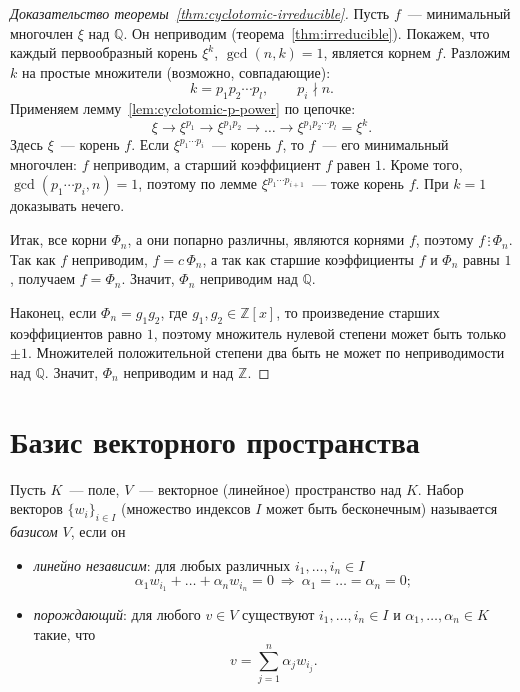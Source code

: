 \documentclass[12pt]{article}
\begin{document}
	\begin{proof}[Доказательство теоремы~\ref{thm:cyclotomic-irreducible}]
		Пусть $f$~--- минимальный многочлен $\xi$ над $\mathbb{Q}$. Он неприводим (теорема~\ref{thm:irreducible}). Покажем, что каждый первообразный корень $\xi^k$, $\gcd(n, k) = 1$, является корнем $f$. Разложим $k$ на простые множители (возможно, совпадающие):
		\[
			k = p_1 p_2 \cdots p_l, \qquad p_i \nmid n.
		\]
		Применяем лемму~\ref{lem:cyclotomic-p-power} по цепочке:
		\[
			\xi \longrightarrow \xi^{p_1} \longrightarrow \xi^{p_1 p_2} \longrightarrow \ldots \longrightarrow \xi^{p_1 p_2 \cdots p_l} = \xi^k.
		\]
		Здесь $\xi$~--- корень $f$. Если $\xi^{p_1 \cdots p_i}$~--- корень $f$, то $f$~--- его минимальный многочлен: $f$ неприводим, а старший коэффициент $f$ равен $1$. Кроме того, $\gcd(p_1 \cdots p_i, n) = 1$, поэтому по лемме $\xi^{p_1 \cdots p_{i+1}}$~--- тоже корень $f$. При $k = 1$ доказывать нечего.

		Итак, все корни $\Phi_n$, а они попарно различны, являются корнями $f$, поэтому $f \,\vdots\, \Phi_n$. Так как $f$ неприводим, $f = c\,\Phi_n$, а так как старшие коэффициенты $f$ и $\Phi_n$ равны $1$, получаем $f = \Phi_n$. Значит, $\Phi_n$ неприводим над $\mathbb{Q}$.

		Наконец, если $\Phi_n = g_1 g_2$, где $g_1, g_2 \in \mathbb{Z}[x]$, то произведение старших коэффициентов равно $1$, поэтому множитель нулевой степени может быть только $\pm 1$. Множителей положительной степени два быть не может по неприводимости над $\mathbb{Q}$. Значит, $\Phi_n$ неприводим и над $\mathbb{Z}$.
	\end{proof}

	\section{Базис векторного пространства}

	\begin{definition}[Базис]\label{def:basis}
		Пусть $K$~--- поле, $V$~--- векторное (линейное) пространство над $K$. Набор векторов $\{ w_i \}_{i \in I}$ (множество индексов $I$ может быть бесконечным) называется \emph{базисом} $V$, если он
		\begin{itemize}
			\item \emph{линейно независим}: для любых различных $i_1, \ldots, i_n \in I$
			\[
				\alpha_1 w_{i_1} + \ldots + \alpha_n w_{i_n} = 0 \ \Rightarrow \ \alpha_1 = \ldots = \alpha_n = 0;
			\]
			\item \emph{порождающий}: для любого $v \in V$ существуют $i_1, \ldots, i_n \in I$ и $\alpha_1, \ldots, \alpha_n \in K$ такие, что
			\[
				v = \sum_{j=1}^{n} \alpha_j w_{i_j}.
			\]
		\end{itemize}
	\end{definition}
\end{document}
